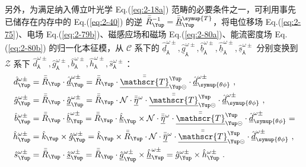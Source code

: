 另外，为满足纳入傅立叶光学 Eq.(\ref{eq:2-18a}) 范畴的必要条件之一，可利用事先已储存在内存中的 Eq.(\ref{eq:2-40}) 的逆 $\bar{\bar{R}}_{\Yup}^{-1} = \bar{\bar{\underline{R}}}_{\Yup}^{\symup{T}}$，将电位移场 Eq.(\ref{eq:2-75})、电场 Eq.(\ref{eq:2-79b})、磁感应场和磁场 Eq.(\ref{eq:2-80a})、能流密度场 Eq.(\ref{eq:2-80b}) 的归一化本征模，从 $\mathcal{C}$ 系下的 $\hat{\underline{d}}^{\omega\pm}_{\Yup}, \hat{\underline{g}}^{\omega\pm}_{\Yup}, \hat{\underline{b}}^{\omega\pm}_{\Yup}, \hat{\underline{h}}^{\omega\pm}_{\Yup}, \hat{\underline{s}}^{\omega\pm}_{\Yup}$ 分别变换到 $\mathcal{Z}$ 系下 $\hat{d}^{\omega\pm}_{\Yup}, \hat{g}^{\omega\pm}_{\Yup}, \hat{b}^{\omega\pm}_{\Yup}, \hat{h}^{\omega\pm}_{\Yup}, \hat{s}^{\omega\pm}_{\Yup}$：
\begin{subequations} \label{eq:2-81}
\begin{align}
	\hat{d}^{\omega\pm}_{\Yup} &= \bar{\bar{R}}_{\Yup} \cdot \hat{\underline{d}}^{\omega\pm}_{\Yup} = \bar{\bar{R}}_{\Yup} \cdot \bar{\bar{\underline{\mathscr{T}}}}^{\Yup}_{\Yup\circleddash} \cdot \hat{\underline{d}}^{\omega\pm}_{\symup{\theta\phi}} \label{eq:2-81a}~,\\ \hat{g}^{\omega\pm}_{\Yup} &= \bar{\bar{R}}_{\Yup} \cdot \hat{\underline{g}}^{\omega\pm}_{\Yup} = \bar{\bar{R}}_{\Yup} \cdot \mathcal{N} \cdot \bar{\bar{\underline{\eta}}}^{\omega} \cdot \bar{\bar{\underline{\mathscr{T}}}}^{\Yup}_{\Yup\circleddash} \cdot \hat{\underline{d}}^{\omega\pm}_{\symup{\theta\phi}}\label{eq:2-81b}~,\\ \hat{b}^{\omega\pm}_{\Yup} &= \bar{\bar{R}}_{\Yup} \cdot \hat{\underline{b}}^{\omega\pm}_{\Yup} = \bar{\bar{R}}_{\Yup} \cdot \hat{\underline{k}}_{\Yup} \times \mathcal{N} \cdot \bar{\bar{\underline{\eta}}}^{\omega} \cdot \bar{\bar{\underline{\mathscr{T}}}}^{\Yup}_{\Yup\circleddash} \cdot \hat{\underline{d}}^{\omega\pm}_{\symup{\theta\phi}} = \label{eq:2-81c}\\ \hat{h}^{\omega\pm}_{\Yup} &= \hat{k}_{\Yup} \times \hat{g}^{\omega\pm}_{\Yup} = \hat{k}_{\Yup} \times \bar{\bar{R}}_{\Yup} \cdot \mathcal{N} \cdot \bar{\bar{\underline{\eta}}}^{\omega} \cdot \bar{\bar{\underline{\mathscr{T}}}}^{\Yup}_{\Yup\circleddash} \cdot \hat{\underline{d}}^{\omega\pm}_{\symup{\theta\phi}} \label{eq:2-81d}~,\\
	\hat{s}^{\omega\pm}_{\Yup} &= \bar{\bar{R}}_{\Yup} \cdot \hat{\underline{s}}^{\omega\pm}_{\Yup} = \bar{\bar{R}}_{\Yup} \cdot \hat{\underline{g}}^{\omega\pm}_{\Yup} \times \hat{\underline{h}}^{\omega\pm}_{\Yup} = \hat{g}^{\omega\pm}_{\Yup} \times \hat{h}^{\omega\pm}_{\Yup} \label{eq:2-81e}~.
\end{align}
\end{subequations}


